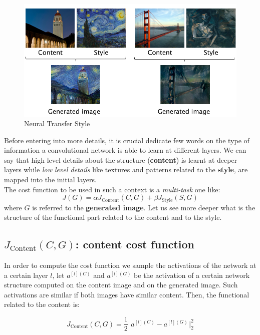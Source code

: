 \begin{figure}[h]
    \centering
    \includegraphics[scale=0.7]{img/NeuralStyle.png}
    \caption{Neural Transfer Style}
\end{figure}

Before entering into more details, it is crucial dedicate few words on the type of information a convolutional network is able to learn at different layers. We can say that high level details about the structure (\textbf{content}) is learnt at deeper layers while \textit{low level details} like textures and patterns related to the \textbf{style}, are mapped into the initial layers. \\

\noindent
The cost function to be used in such a context is a \textit{multi-task} one like: 
\begin{equation}
    J(G)=\alpha{J_{\text{Content}}(C,G)+\beta{J_{\text{Style}}(S,G)}}
\end{equation}
where $G$ is referred to the \textbf{generated image}. Let us see more deeper what is the structure of the functional part related to the content and to the style.

\subsection{$J_{\text{Content}}(C,G)$: content cost function}
In order to compute the cost function we sample the activations of the network at a certain layer $l$, let $a^{[l](C)}$ and $a^{[l](G)}$ be the activation of a certain network structure computed on the content image and on the generated image. Such activations are similar if both images have similar content. Then, the functional related to the content is:

\begin{equation}
    J_{\text{Content}}(C,G)=\frac{1}{2} \Vert a^{[l](C)}-a^{[l](G)} \Vert_2^2
\end{equation}

